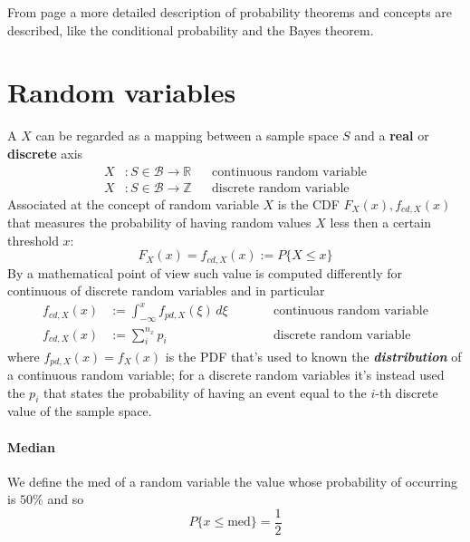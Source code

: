 	From page \pageref{sec:probabilityresume} a more detailed description of probability theorems and concepts are described, like the conditional probability and the Bayes theorem.

\section{Random variables}
	A  $X$ can be regarded as a mapping between a sample space $S$ and a \textbf{real} or \textbf{discrete} axis
	\begin{align*}
		X&: S \in \mathscr B \rightarrow \mathds R  && \text{continuous random variable} \\
		X&: S \in \mathscr B \rightarrow \mathds Z  && \text{discrete random variable} 
	\end{align*}
	Associated at the concept of random variable $X$ is the   CDF $F_X(x), f_{cd,X}(x)$ that measures the probability of having random values $X$ less then a certain threshold $x$:
	\[ F_X(x) = f_{cd,X}(x) := P \big\{ X \leq x \big\} \]
	By a mathematical point of view such value is computed differently for continuous of discrete random variables and in particular
	\begin{equation} \label{eq:prob:cdf}
	\begin{aligned}
		f_{cd,X}(x)& := \int_{-\infty}^x f_{pd,X}(\xi)\, d\xi   \qquad && \text{continuous random variable} \\
		f_{cd,X}(x)& := \sum_i^{n_x} p_i && \text{discrete random variable} 
	\end{aligned}
	\end{equation}
	where $f_{pd,X}(x)=f_X(x)$ is the  PDF that's used to known the \textbf{\textit{distribution}} of a continuous random variable; for a discrete random variables it's instead used the  $p_i$ that states the probability of having an event equal to the $i$-th discrete value of the sample space.	
	
	\paragraph{Median} We define the  $\textrm{med}$ of a random variable the value whose probability of occurring is $50\%$ and so 
	\begin{equation}
		P\big\{ x \leq \textrm{med} \big\} = \frac 12
	\end{equation}
	
